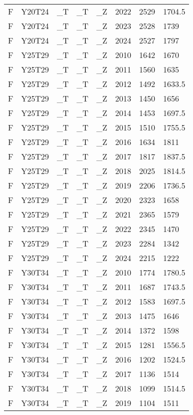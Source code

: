 \begin{longtable}[t]{llllllll}
F & Y20T24 & \_T & \_T & \_Z & 2022 & 2529 & 1704.5\\
F & Y20T24 & \_T & \_T & \_Z & 2023 & 2528 & 1739\\
F & Y20T24 & \_T & \_T & \_Z & 2024 & 2527 & 1797\\
\addlinespace
F & Y25T29 & \_T & \_T & \_Z & 2010 & 1642 & 1670\\
F & Y25T29 & \_T & \_T & \_Z & 2011 & 1560 & 1635\\
F & Y25T29 & \_T & \_T & \_Z & 2012 & 1492 & 1633.5\\
F & Y25T29 & \_T & \_T & \_Z & 2013 & 1450 & 1656\\
F & Y25T29 & \_T & \_T & \_Z & 2014 & 1453 & 1697.5\\
\addlinespace
F & Y25T29 & \_T & \_T & \_Z & 2015 & 1510 & 1755.5\\
F & Y25T29 & \_T & \_T & \_Z & 2016 & 1634 & 1811\\
F & Y25T29 & \_T & \_T & \_Z & 2017 & 1817 & 1837.5\\
F & Y25T29 & \_T & \_T & \_Z & 2018 & 2025 & 1814.5\\
F & Y25T29 & \_T & \_T & \_Z & 2019 & 2206 & 1736.5\\
\addlinespace
F & Y25T29 & \_T & \_T & \_Z & 2020 & 2323 & 1658\\
F & Y25T29 & \_T & \_T & \_Z & 2021 & 2365 & 1579\\
F & Y25T29 & \_T & \_T & \_Z & 2022 & 2345 & 1470\\
F & Y25T29 & \_T & \_T & \_Z & 2023 & 2284 & 1342\\
F & Y25T29 & \_T & \_T & \_Z & 2024 & 2215 & 1222\\
\addlinespace
F & Y30T34 & \_T & \_T & \_Z & 2010 & 1774 & 1780.5\\
F & Y30T34 & \_T & \_T & \_Z & 2011 & 1687 & 1743.5\\
F & Y30T34 & \_T & \_T & \_Z & 2012 & 1583 & 1697.5\\
F & Y30T34 & \_T & \_T & \_Z & 2013 & 1475 & 1646\\
F & Y30T34 & \_T & \_T & \_Z & 2014 & 1372 & 1598\\
\addlinespace
F & Y30T34 & \_T & \_T & \_Z & 2015 & 1281 & 1556.5\\
F & Y30T34 & \_T & \_T & \_Z & 2016 & 1202 & 1524.5\\
F & Y30T34 & \_T & \_T & \_Z & 2017 & 1136 & 1514\\
F & Y30T34 & \_T & \_T & \_Z & 2018 & 1099 & 1514.5\\
F & Y30T34 & \_T & \_T & \_Z & 2019 & 1104 & 1511\\

\end{longtable}
